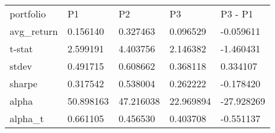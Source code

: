 \begin{tabular}{lllll}
\toprule
\midrule
portfolio & P1 & P2 & P3 & P3 - P1 \\
avg_return & 0.156140 & 0.327463 & 0.096529 & -0.059611 \\
t-stat & 2.599191 & 4.403756 & 2.146382 & -1.460431 \\
stdev & 0.491715 & 0.608662 & 0.368118 & 0.334107 \\
sharpe & 0.317542 & 0.538004 & 0.262222 & -0.178420 \\
alpha & 50.898163 & 47.216038 & 22.969894 & -27.928269 \\
alpha_t & 0.661105 & 0.456530 & 0.403708 & -0.551137 \\
\bottomrule
\end{tabular}

